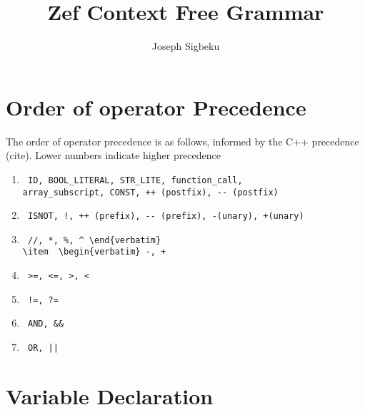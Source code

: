 \documentclass[11pt]{article}
\begin{document}
\author{Joseph Sigbeku}
\title{Zef Context Free Grammar}
\maketitle
\newpage
\section {Order of operator Precedence}
The order of operator precedence is as follows, informed by the C++ precedence (cite).
Lower numbers indicate higher precedence

\begin{enumerate}
\item  \begin{verbatim} ID, BOOL_LITERAL, STR_LITE, function_call, 
array_subscript, CONST, ++ (postfix), -- (postfix) \end{verbatim}
\item  \begin{verbatim} ISNOT, !, ++ (prefix), -- (prefix), -(unary), +(unary) \end{verbatim}
\item  \begin{verbatim} //, *, %, ^ \end{verbatim}
\item  \begin{verbatim} -, + \end{verbatim}
\item  \begin{verbatim} >=, <=, >, < \end{verbatim}
\item  \begin{verbatim} !=, ?= \end{verbatim}
\item  \begin{verbatim} AND, && \end{verbatim}
\item  \begin{verbatim} OR, || \end{verbatim}
\end{enumerate}

\section{Variable Declaration}
\end{document}
